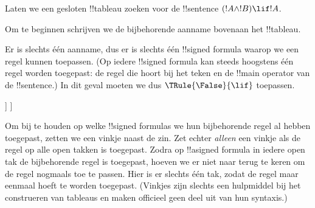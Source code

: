 \documentclass[openany]{memoir}
\begin{document}
\begingroup
\def\olfilename{OLP-0103}
\def\olfilepath{content/first-order-logic/tableaux/}
\hypertarget{unit-OLP-0103}{}



      {}
      {}


\begin{ex}
Laten we een gesloten !!{tableau} zoeken voor de !!{sentence}
$(!A \land !B) \lif !A$.

Om te beginnen schrijven we de bijbehorende aanname bovenaan het
!!{tableau}.
\begin{oltableau}
  [\sFmla{\False}{(\formula{A} \land \formula{B}) \lif \formula{A}},
    just = \TAss]
\end{oltableau}

Er is slechts één aanname, dus er is slechts één !!{signed formula}
waarop we een regel kunnen toepassen. (Op iedere !!{signed formula} kan
steeds hoogstens één regel worden toegepast: de regel die hoort bij het
teken en de !!{main operator} van de !!{sentence}.) In dit geval moeten
we dus $\TRule{\False}{\lif}$ toepassen.
\begin{oltableau}
  [\sFmla{\False}{(\formula{A} \land \formula{B}) \lif \formula{A}},
    checked, just = \TAss
    [\sFmla{\True}{\formula{A} \land \formula{B}},
      just={\TRule{\False}{\lif}[1]}
      [\sFmla{\False}{\formula{A}}, just={\TRule{\False}{\lif}[1]}]
    ]
  ]
\end{oltableau}
Om bij te houden op welke !!{signed formula}s we hun bijbehorende regel
al hebben toegepast, zetten we een vinkje naast de zin. Zet echter
\emph{alleen} een vinkje als de regel op alle open takken is toegepast.
Zodra op !!a{signed formula} in iedere open tak de bijbehorende regel is
toegepast, hoeven we er niet naar terug te keren om de regel nogmaals toe
te passen. Hier is er slechts één tak, zodat de regel maar eenmaal hoeft
te worden toegepast. (Vinkjes zijn slechts een hulpmiddel bij het
construeren van tableaus en maken officieel geen deel uit van hun
syntaxis.)


\end{ex}
\end{document}
